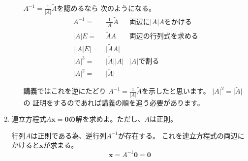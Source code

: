 \documentclass[10pt,b5paper]{ltjsarticle}
\begin{document}
\begin{enumerate}
\begin{enumerate}
              $A^{-1}=\frac{1}{\lvert A \rvert}\tilde{A}$を認めるなら
              次のようになる。
              \begin{align}
               A^{-1}=&\frac{1}{\lvert A \rvert}\tilde{A} &  両辺に \lvert A \rvert Aをかける\\
               \lvert A \rvert E =&\tilde{A}A & 両辺の行列式を求める\\
               \lvert \lvert A \rvert E\rvert =& \lvert\tilde{A}A\rvert\\
               \lvert A \rvert ^3 =& \lvert\tilde{A}\rvert \lvert A\rvert & \lvert A \rvert で割る \\
               \lvert A \rvert ^2 =& \lvert\tilde{A}\rvert
              \end{align}

              講義ではこれを逆にたどり
              $A^{-1}=\frac{1}{\lvert A \rvert}\tilde{A}$を示したと思います。
              $\lvert A \rvert ^2 = \lvert \tilde{A}\rvert$の
              証明をするのであれば講義の順を追う必要があります。

       \end{enumerate}
 \item 連立方程式$A\boldsymbol{x}=\bm{0}$の解を求めよ。ただし、$A$は正則。

       行列$A$は正則である為、逆行列$A^{-1}$が存在する。
       これを連立方程式の両辺にかけると$\bm{x}$が求まる。
       \begin{equation}
        \bm{x}=A^{-1}\bm{0} = \bm{0}
       \end{equation}


\end{enumerate}
\end{document}
